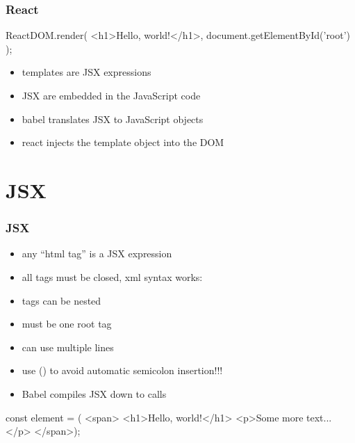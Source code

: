 \begin{frame}[fragile] \frametitle{React}
\begin{CodeBox}{}
ReactDOM.render(
  <h1>Hello, world!</h1>,
  document.getElementById('root')
);
\end{CodeBox}

\vspace{8mm}
\begin{itemize}
  \item templates are JSX expressions
  \item JSX are embedded in the JavaScript code
  \item babel translates JSX to JavaScript objects
  \item react injects the template object into the DOM
\end{itemize}

\end{frame}

\section{JSX}
\begin{frame}[fragile] \frametitle{JSX}
\begin{itemize}
  \item any ``html tag'' is a JSX expression
  \item all tags must be closed, xml syntax works: 
  \item tags can be nested
  \item must be one root tag
  \item can use multiple lines
  \item use () to avoid automatic semicolon insertion!!!
  \item Babel compiles JSX down to  calls
\end{itemize}

\begin{CodeBox}{}
const element = (
<span>
  <h1>Hello, world!</h1>
  <p>Some more text...</p>
</span>);
\end{CodeBox}
\end{frame}

